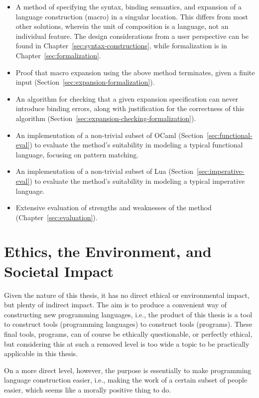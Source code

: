 \documentclass{kththesis}
\begin{document}
\begin{itemize}
  \item A method of specifying the syntax, binding semantics, and expansion of a language construction (macro) in a singular location. This differs from most other solutions, wherein the unit of composition is a language, not an individual feature. The design considerations from a user perspective can be found in Chapter~\ref{sec:syntax-constructions}, while formalization is in Chapter~\ref{sec:formalization}.
  \item Proof that macro expansion using the above method terminates, given a finite input (Section~\ref{sec:expansion-formalization}).
  \item An algorithm for checking that a given expansion specification can never introduce binding errors, along with justification for the correctness of this algorithm (Section~\ref{sec:expansion-checking-formalization}).
  \item An implementation of a non-trivial subset of OCaml (Section~\ref{sec:functional-eval}) to evaluate the method's suitability in modeling a typical functional language, focusing on pattern matching.
  \item An implementation of a non-trivial subset of Lua (Section~\ref{sec:imperative-eval}) to evaluate the method's suitability in modeling a typical imperative language.
  \item Extensive evaluation of strengths and weaknesses of the method (Chapter~\ref{sec:evaluation}).
\end{itemize}

\section{Ethics, the Environment, and Societal Impact}

Given the nature of this thesis, it has no direct ethical or environmental impact, but plenty of indirect impact. The aim is to produce a convenient way of constructing new programming languages, i.e., the product of this thesis is a tool to construct tools (programming languages) to construct tools (programs). These final tools, programs, can of course be ethically questionable, or perfectly ethical, but considering this at such a removed level is too wide a topic to be practically applicable in this thesis.

On a more direct level, however, the purpose is essentially to make programming language construction easier, i.e., making the work of a certain subset of people easier, which seems like a morally positive thing to do.
\end{document}
